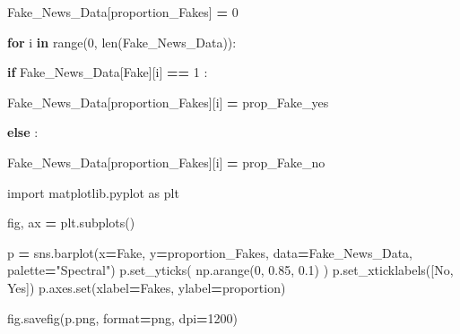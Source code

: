 \documentclass[
  11pt,
  a4paper,
]{article}
\newenvironment{Shaded}{\begin{snugshade}}{\end{snugshade}}
\newcommand{\BuiltInTok}[1]{#1}
\newcommand{\ControlFlowTok}[1]{\textcolor[rgb]{0.13,0.29,0.53}{\textbf{#1}}}
\newcommand{\DecValTok}[1]{\textcolor[rgb]{0.00,0.00,0.81}{#1}}
\newcommand{\FloatTok}[1]{\textcolor[rgb]{0.00,0.00,0.81}{#1}}
\newcommand{\ImportTok}[1]{#1}
\newcommand{\KeywordTok}[1]{\textcolor[rgb]{0.13,0.29,0.53}{\textbf{#1}}}
\newcommand{\NormalTok}[1]{#1}
\newcommand{\OperatorTok}[1]{\textcolor[rgb]{0.81,0.36,0.00}{\textbf{#1}}}
\newcommand{\StringTok}[1]{\textcolor[rgb]{0.31,0.60,0.02}{#1}}
\begin{document}
\begin{Shaded}
\begin{Highlighting}[]
\NormalTok{Fake\_News\_Data[}\StringTok{\textquotesingle{}proportion\_Fakes\textquotesingle{}}\NormalTok{] }\OperatorTok{=} \DecValTok{0}


\ControlFlowTok{for}\NormalTok{ i }\KeywordTok{in} \BuiltInTok{range}\NormalTok{(}\DecValTok{0}\NormalTok{, }\BuiltInTok{len}\NormalTok{(Fake\_News\_Data)):}

    \ControlFlowTok{if}\NormalTok{ Fake\_News\_Data[}\StringTok{\textquotesingle{}Fake\textquotesingle{}}\NormalTok{][i] }\OperatorTok{==} \DecValTok{1}\NormalTok{ :}

\NormalTok{        Fake\_News\_Data[}\StringTok{\textquotesingle{}proportion\_Fakes\textquotesingle{}}\NormalTok{][i] }\OperatorTok{=}\NormalTok{ prop\_Fake\_yes}

    \ControlFlowTok{else}\NormalTok{ :}

\NormalTok{        Fake\_News\_Data[}\StringTok{\textquotesingle{}proportion\_Fakes\textquotesingle{}}\NormalTok{][i] }\OperatorTok{=}\NormalTok{ prop\_Fake\_no}
\end{Highlighting}
\end{Shaded}

\begin{Shaded}
\begin{Highlighting}[]
\ImportTok{import}\NormalTok{ matplotlib.pyplot }\ImportTok{as}\NormalTok{ plt}

\NormalTok{fig, ax }\OperatorTok{=}\NormalTok{ plt.subplots()}


\NormalTok{p }\OperatorTok{=}\NormalTok{ sns.barplot(x}\OperatorTok{=}\StringTok{\textquotesingle{}Fake\textquotesingle{}}\NormalTok{, y}\OperatorTok{=}\StringTok{\textquotesingle{}proportion\_Fakes\textquotesingle{}}\NormalTok{, data}\OperatorTok{=}\NormalTok{Fake\_News\_Data, palette}\OperatorTok{=}\StringTok{"Spectral"}\NormalTok{) }
\NormalTok{p.set\_yticks( np.arange(}\DecValTok{0}\NormalTok{, }\FloatTok{0.85}\NormalTok{, }\FloatTok{0.1}\NormalTok{)  )}
\NormalTok{p.set\_xticklabels([}\StringTok{\textquotesingle{}No\textquotesingle{}}\NormalTok{, }\StringTok{\textquotesingle{}Yes\textquotesingle{}}\NormalTok{])}
\NormalTok{p.axes.}\BuiltInTok{set}\NormalTok{(xlabel}\OperatorTok{=}\StringTok{\textquotesingle{}Fakes\textquotesingle{}}\NormalTok{, ylabel}\OperatorTok{=}\StringTok{\textquotesingle{}proportion\textquotesingle{}}\NormalTok{)}

\NormalTok{fig.savefig(}\StringTok{\textquotesingle{}p.png\textquotesingle{}}\NormalTok{, }\BuiltInTok{format}\OperatorTok{=}\StringTok{\textquotesingle{}png\textquotesingle{}}\NormalTok{, dpi}\OperatorTok{=}\DecValTok{1200}\NormalTok{)}
\end{Highlighting}
\end{Shaded}
\end{document}
